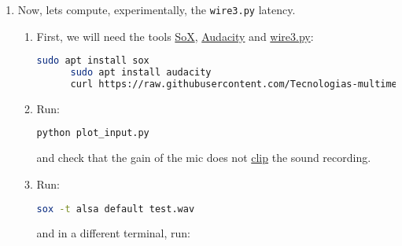 \begin{enumerate}
  \begin{lstlisting}[language=Bash]
    python wire3.py
  \end{lstlisting}
  
  althought probably you will obtain the error:
  
  \begin{lstlisting}[language=Bash]
    nose
  \end{lstlisting}

  This is solved intalling the
  \href{https://python-sounddevice.readthedocs.io/en/latest/}{python-sounddevice}
  \cite{sounddevice} module with:

  \begin{lstlisting}[language=Bash]
    pip install sounddevice
  \end{lstlisting}

\item Now, lets compute, experimentally, the \texttt{wire3.py}
  latency.

  \begin{enumerate} \item First, we will need the
  tools \href{http://sox.sourceforge.net/}{SoX}, \href{https://www.audacityteam.org/}{Audacity}
  and \href{https://raw.githubusercontent.com/Tecnologias-multimedia/intercom/master/test/sounddevice/wire3.py}{wire3.py}:
  
    \begin{lstlisting}[language=Bash]
      sudo apt install sox
      sudo apt install audacity
      curl https://raw.githubusercontent.com/Tecnologias-multimedia/intercom/master/test/sounddevice/plot_input.py > plot_input.py
    \end{lstlisting}

  \item Run:

    \begin{lstlisting}[language=Bash]
      python plot_input.py
    \end{lstlisting}

    and check that the gain of the mic does not
    \href{https://en.wikipedia.org/wiki/Clipping_(audio)}{clip} the
    sound recording.

  \item Run:

    \begin{lstlisting}[language=Bash]
      sox -t alsa default test.wav
    \end{lstlisting}

    and in a different terminal, run:


\end{enumerate}
\end{enumerate}
